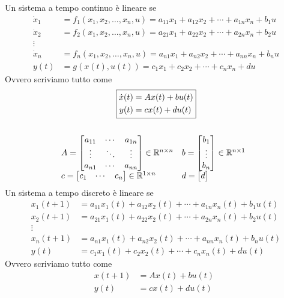 \documentclass[10pt,a4paper]{book}
\begin{document}
Un sistema a tempo continuo è lineare se
\begin{align*}
\dot{x}_1 & =f_1( x_1 ,x_2 ,\dotsc ,x_n ,u) =a_{11} x_1 +a_{12} x_2 +\cdots +a_{1n} x_n +b_1 u\\
\dot{x}_2 & =f_2( x_1 ,x_2 ,\dotsc ,x_n ,u) =a_{21} x_1 +a_{22} x_2 +\cdots +a_{2n} x_n +b_2 u\\
\vdots  & \\
\dot{x}_n & =f_n( x_1 ,x_2 ,\dotsc ,x_n ,u) =a_{n1} x_1 +a_{n2} x_2 +\cdots +a_{nn} x_n +b_n u\\
y(t) & =g(x(t),u(t) )=c_1 x_1 +c_2 x_2 +\cdots +c_n x_n +du
\end{align*}
Ovvero scriviamo tutto come
\begin{gather*}
\boxed{
\begin{aligned}
\dot{x}(t) & =Ax(t) +bu(t)\\
y(t) & =cx(t) +du(t)
\end{aligned}
}\\
\\
\begin{array}{ l l }
A=\begin{bmatrix}
a_{11} & \cdots  & a_{1n}\\
\vdots  & \ddots  & \vdots \\
a_{n1} & \cdots  & a_{nn}
\end{bmatrix} \in \mathbb{R}^{n\times n} & b=\begin{bmatrix}
b_1\\
\vdots \\
b_n
\end{bmatrix} \in \mathbb{R}^{n\times 1}\\
c=\begin{bmatrix}
c_1 & \cdots  & c_n
\end{bmatrix} \in \mathbb{R}^{1\times n} & d=\begin{bmatrix}
d
\end{bmatrix}
\end{array} \ \ 
\end{gather*}
Un sistema a tempo discreto è lineare se
\begin{align*}
x_1( t+1) & =a_{11} x_1(t) +a_{12} x_2(t) +\cdots +a_{1n} x_n(t) +b_1 u(t)\\
x_2( t+1) & =a_{21} x_1(t) +a_{22} x_2(t) +\cdots +a_{2n} x_n(t) +b_2 u(t)\\
\vdots  & \\
x_n( t+1) & =a_{n1} x_1(t) +a_{n2} x_2(t) +\cdots +a_{nn} x_n(t) +b_n u(t)\\
y(t) & =c_1 x_1(t) +c_2 x_2(t) +\cdots +c_n x_n(t) +du(t)
\end{align*}
Ovvero scriviamo tutto come
\begin{equation*}
\boxed{
\begin{aligned}
x( t+1) & =Ax(t) +bu(t)\\
y(t) & =cx(t) +du(t)
\end{aligned} \ \ }
\end{equation*}
\end{document}
